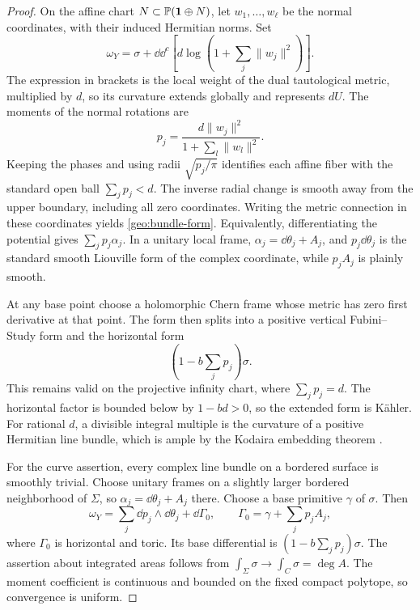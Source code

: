 \begin{proof}
On the affine chart \(N\subset\mathbb P(\mathbf1\oplus N)\), let
\(w_1,\ldots,w_\ell\) be the normal coordinates, with their induced
Hermitian norms. Set
\[
 \omega_Y=\sigma+
 \dd\dd^c\left[d\log\left(1+\sum_j\lVert w_j\rVert^2\right)\right].
\]
The expression in brackets is the local weight of the dual
tautological metric, multiplied by \(d\), so its curvature
extends globally and represents \(dU\).
The moments of the normal rotations are
\begin{equation}\label{geo:bundle-moments}
 p_j=\frac{d\lVert w_j\rVert^2}
 {1+\sum_l\lVert w_l\rVert^2}.
\end{equation}
Keeping the phases and using radii \(\sqrt{p_j/\pi}\) identifies
each affine fiber with the standard open ball
\(\sum_jp_j<d\). The inverse radial change is smooth away from
the upper boundary, including all zero coordinates.
Writing the metric connection in these coordinates yields
\eqref{geo:bundle-form}. Equivalently, differentiating the
potential gives \(\sum_jp_j\alpha_j\). In a unitary local frame,
\(\alpha_j=\dd\theta_j+A_j\), and
\(p_j\dd\theta_j\) is the standard smooth Liouville form of the
complex coordinate, while \(p_jA_j\) is plainly smooth.

At any base point choose a holomorphic Chern frame whose metric
has zero first derivative at that point. The form then splits
into a positive vertical Fubini--Study form and the horizontal
form
\[
 \left(1-b\sum_jp_j\right)\sigma.
\]
This remains valid on the projective infinity chart, where
\(\sum_jp_j=d\). The horizontal factor is bounded below by
\(1-bd>0\), so the extended form is K\"ahler.
For rational \(d\), a divisible integral multiple is the
curvature of a positive Hermitian line bundle, which is ample
by the Kodaira embedding theorem
\cite[\S1.2.C, p.~43]{Lazarsfeld2004}.

For the curve assertion, every complex line bundle on a bordered
surface is smoothly trivial. Choose unitary frames on a slightly
larger bordered neighborhood of \(\Sigma\), so
\(\alpha_j=\dd\theta_j+A_j\) there. Choose a base primitive
\(\gamma\) of \(\sigma\). Then
\[
 \omega_Y=\sum_j\dd p_j\wedge\dd\theta_j+
 \dd\Gamma_0,\qquad
 \Gamma_0=\gamma+\sum_jp_jA_j,
\]
where \(\Gamma_0\) is horizontal and toric. Its base differential
is \((1-b\sum_jp_j)\sigma\).
The assertion about integrated areas follows from
\(\int_\Sigma\sigma\to\int_C\sigma=\deg A\).
The moment coefficient is continuous and bounded on the fixed
compact polytope, so convergence is uniform.
\end{proof}

